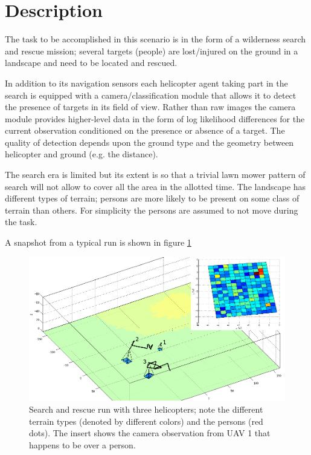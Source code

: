 \documentclass[a4paper,11pt]{report}
\begin{document}
\section{Description}
The task to be accomplished in this scenario is in the form of a wilderness search and rescue mission; several targets (people) are lost/injured on the ground in a landscape and need to be located and rescued. 

In addition to its navigation sensors each helicopter agent taking part in the search 
is equipped with a camera/classification module that allows it to detect the presence of targets in its field of view. Rather than raw images the camera module provides higher-level data in the form of log likelihood differences for the current observation conditioned on the presence or absence of a target. The quality of detection depends upon the ground type and the geometry between helicopter and ground (e.g. the distance). 

The search era is limited but its extent is so that a trivial lawn mower pattern of search will not allow to cover all the area in the allotted time. The landscape has different types of terrain; persons are more likely to be present on some class of terrain than others. For simplicity the persons are assumed to not move during the task. 

A snapshot from a typical run is shown in figure \ref{fig:searchrescue}
\begin{figure}[h]
\centering
\includegraphics[width=16cm]{searchrescue.jpg}
\caption{Search and rescue run with three helicopters; note the different terrain types (denoted by different colors) and the persons (red dots). The insert shows the camera observation from UAV 1 that happens to be over a person. \label{fig:searchrescue}}
\end{figure}
\end{document}
